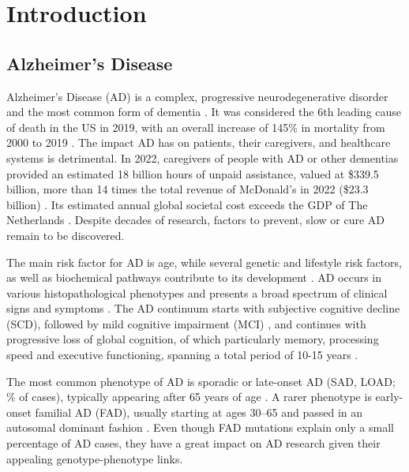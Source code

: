 \documentclass{amsart}
\theoremstyle{plain}
\newcommand{\mainmatter}{
    \newpage
    \pagenumbering{arabic}  %
}
\begin{document}
\mainmatter

\section{Introduction}\label{Intro}
\subsection{Alzheimer’s Disease}
Alzheimer’s Disease (AD) is a complex, progressive neurodegenerative disorder and the most common form of dementia \cite{Penke2023NewDisease}. It was considered the 6th leading cause of death in the US in 2019, with an overall increase of 145\% in mortality from 2000 to 2019 \cite{20232023Figures}. The impact AD has on patients, their caregivers, and healthcare systems is detrimental. In 2022, caregivers of people with AD or other dementias provided an estimated 18 billion hours of unpaid assistance, valued at \$339.5 billion, more than 14 times the total revenue of McDonald's in 2022 (\$23.3 billion) \cite{20232023Figures}. Its estimated annual global societal cost exceeds the GDP of The Netherlands \cite{Wimo2023The2019}. Despite decades of research, factors to prevent, slow or cure AD remain to be discovered.

The main risk factor for AD is age, while several genetic and lifestyle risk factors, as well as biochemical pathways contribute to its development \cite{Penke2023NewDisease}. AD occurs in various histopathological phenotypes and presents a broad spectrum of clinical signs and symptoms \cite{Heneka2015NeuroinflammationDisease, Edwards2019ANeurodegeneration}. The AD continuum starts with subjective cognitive decline (SCD), followed by mild cognitive impairment (MCI) \cite{Rasmussen2019AlzheimersDiagnosis}, and continues with progressive loss of global cognition, of which particularly memory, processing speed and executive functioning, spanning a total period of 10-15 years \cite{Scheltens2016AlzheimersDisease}. 

The most common phenotype of AD is sporadic or late-onset AD (SAD, LOAD; \% of cases), typically appearing after 65 years of age \cite{Beydoun2014EpidemiologicMeta-analysis}. A rarer phenotype is early-onset familial AD (FAD), usually starting at ages 30–65 and passed in an autosomal dominant fashion \cite{VanCauwenberghe2015ThePerspectives}.
Even though FAD mutations explain only a small percentage of AD cases, they have a great impact on AD research given their appealing genotype-phenotype links.
\end{document}
